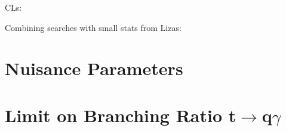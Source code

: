 CLs:\cite{Read:2002hq}

Combining searches with small stats from Lizas: \cite{Junk:1999kv}

\section{Nuisance Parameters}

\section{Limit on Branching Ratio t$\rightarrow$q$\gamma$}



%
